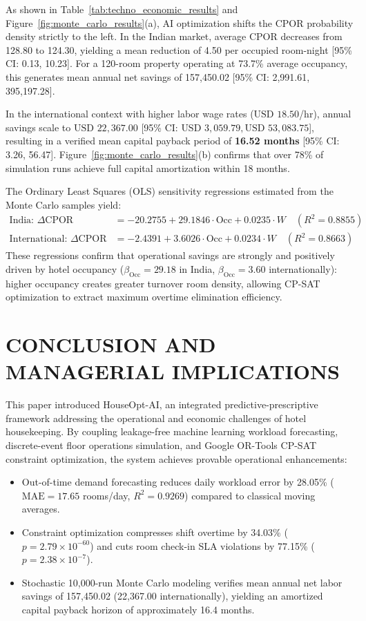 \documentclass[11pt,a4paper]{article}
\newcommand{\INR}{\text{INR }}
\newcommand{\USD}{\text{USD }}
\begin{document}
As shown in Table~\ref{tab:techno_economic_results} and Figure~\ref{fig:monte_carlo_results}(a), AI optimization shifts the CPOR probability density strictly to the left. In the Indian market, average CPOR decreases from \INR 128.80 to \INR 124.30, yielding a mean reduction of \INR 4.50 per occupied room-night [95\% CI: 0.13, 10.23]. For a 120-room property operating at 73.7\% average occupancy, this generates mean annual net savings of \INR 157,450.02 [95\% CI: \INR 2,991.61, \INR 395,197.28]. 

In the international context with higher labor wage rates ($\USD 18.50$/hr), annual savings scale to $\USD 22,367.00$ [95\% CI: $\USD 3,059.79, \USD 53,083.75$], resulting in a verified mean capital payback period of \textbf{16.52 months} [95\% CI: 3.26, 56.47]. Figure~\ref{fig:monte_carlo_results}(b) confirms that over 78\% of simulation runs achieve full capital amortization within 18 months.

The Ordinary Least Squares (OLS) sensitivity regressions estimated from the Monte Carlo samples yield:
\begin{align}
\text{India: } \Delta \text{CPOR} &= -20.2755 + 29.1846 \cdot \text{Occ} + 0.0235 \cdot W \quad (R^2 = 0.8855) \label{eq:sens_india} \\
\text{International: } \Delta \text{CPOR} &= -2.4391 + 3.6026 \cdot \text{Occ} + 0.0234 \cdot W \quad (R^2 = 0.8663) \label{eq:sens_intl}
\end{align}
These regressions confirm that operational savings are strongly and positively driven by hotel occupancy ($\beta_{\text{Occ}} = 29.18$ in India, $\beta_{\text{Occ}} = 3.60$ internationally): higher occupancy creates greater turnover room density, allowing CP-SAT optimization to extract maximum overtime elimination efficiency.

\section{CONCLUSION AND MANAGERIAL IMPLICATIONS}

This paper introduced HouseOpt-AI, an integrated predictive-prescriptive framework addressing the operational and economic challenges of hotel housekeeping. By coupling leakage-free machine learning workload forecasting, discrete-event floor operations simulation, and Google OR-Tools CP-SAT constraint optimization, the system achieves provable operational enhancements:
\begin{itemize}
    \item Out-of-time demand forecasting reduces daily workload error by 28.05\% ($\text{MAE} = 17.65$ rooms/day, $R^2 = 0.9269$) compared to classical moving averages.
    \item Constraint optimization compresses shift overtime by 34.03\% ($p = 2.79 \times 10^{-60}$) and cuts room check-in SLA violations by 77.15\% ($p = 2.38 \times 10^{-7}$).
    \item Stochastic 10,000-run Monte Carlo modeling verifies mean annual net labor savings of \INR 157,450.02 (\USD 22,367.00 internationally), yielding an amortized capital payback horizon of approximately 16.4 months.
\end{itemize}
\end{document}
